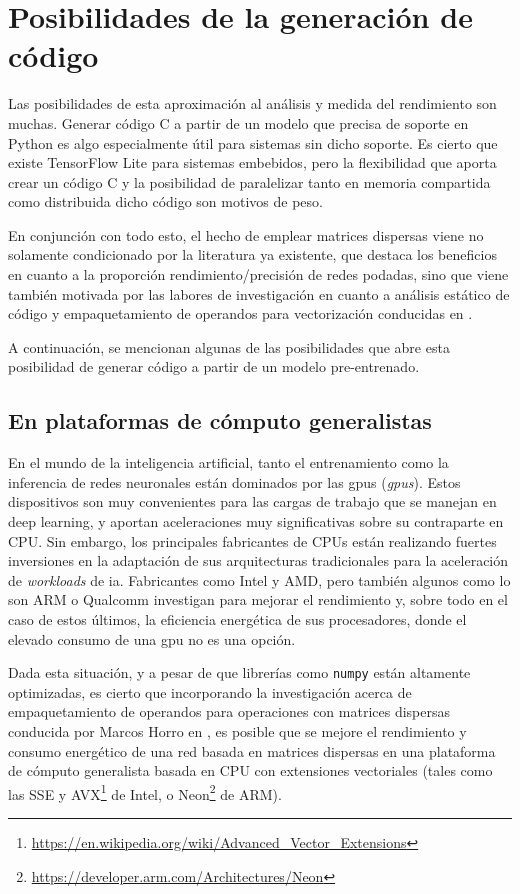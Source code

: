 \section{Posibilidades de la generación de código}
\label{sec:posibilidades_de_la_generacion_de_codigo}
Las posibilidades de esta aproximación al análisis y medida del rendimiento son muchas. Generar código C a partir de un modelo que precisa de soporte en Python es algo especialmente útil para sistemas sin dicho soporte. Es cierto que existe TensorFlow Lite para sistemas embebidos, pero la flexibilidad que aporta crear un código C y la posibilidad de paralelizar tanto en memoria compartida como distribuida dicho código son motivos de peso.

En conjunción con todo esto, el hecho de emplear matrices dispersas viene no solamente condicionado por la literatura ya existente, que destaca los beneficios en cuanto a la proporción rendimiento/precisión de redes podadas, sino que viene también motivada por las labores de investigación en cuanto a análisis estático de código y empaquetamiento de operandos para vectorización conducidas en \cite{custom_high_performance_vector_codegen_sparse_computations}.

A continuación, se mencionan algunas de las posibilidades que abre esta posibilidad de generar código a partir de un modelo pre-entrenado.

\subsection{En plataformas de cómputo generalistas}
\label{ssec:posibilidades_en_computo_generalistas}
En el mundo de la inteligencia artificial, tanto el entrenamiento como la inferencia de redes neuronales están dominados por las \acrshort{gpu}s (\textit{\acrlong{gpu}s}). Estos dispositivos son muy convenientes para las cargas de trabajo que se manejan en deep learning, y aportan aceleraciones muy significativas sobre su contraparte en CPU. Sin embargo, los principales fabricantes de CPUs están realizando fuertes inversiones en la adaptación de sus arquitecturas tradicionales para la aceleración de \textit{workloads} de \acrshort{ia}. Fabricantes como Intel y AMD, pero también algunos como lo son ARM o Qualcomm investigan para mejorar el rendimiento y, sobre todo en el caso de estos últimos, la eficiencia energética de sus procesadores, donde el elevado consumo de una \acrshort{gpu} no es una opción.

Dada esta situación, y a pesar de que librerías como \texttt{numpy} están altamente optimizadas, es cierto que incorporando la investigación acerca de empaquetamiento de operandos para operaciones con matrices dispersas conducida por Marcos Horro en \cite{horro2022manycore}, es posible que se mejore el rendimiento y consumo energético de una red basada en matrices dispersas en una plataforma de cómputo generalista basada en CPU con extensiones vectoriales (tales como las SSE y AVX\footnote{\url{https://en.wikipedia.org/wiki/Advanced\_Vector\_Extensions}} de Intel, o Neon\footnote{\url{https://developer.arm.com/Architectures/Neon}} de ARM).

